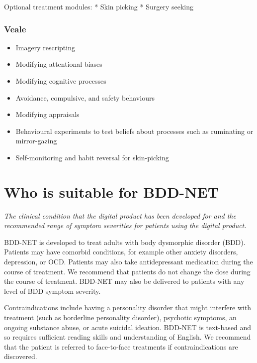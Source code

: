 \documentclass[]{book}
\providecommand{\tightlist}{%
  \setlength{\itemsep}{0pt}\setlength{\parskip}{0pt}}
\theoremstyle{definition}
\theoremstyle{definition}
\theoremstyle{definition}
\theoremstyle{remark}
\begin{document}
Optional treatment modules: * Skin picking * Surgery seeking

\hypertarget{veale-veale2010}{%
\subsubsection{\texorpdfstring{Veale
\citep{veale2010}}{Veale {[}@veale2010{]}}}\label{veale-veale2010}}

\begin{itemize}
\tightlist
\item
  Imagery rescripting
\item
  Modifying attentional biases
\item
  Modifying cognitive processes
\item
  Avoidance, compulsive, and safety behaviours
\item
  Modifying appraisals
\item
  Behavioural experiments to test beliefs about processes such as
  ruminating or mirror-gazing
\item
  Self-monitoring and habit reversal for skin-picking
\end{itemize}

\hypertarget{who-is-suitable-for-bdd-net}{%
\section{Who is suitable for
BDD-NET}\label{who-is-suitable-for-bdd-net}}

\emph{The clinical condition that the digital product has been developed
for and the recommended range of symptom severities for patients using
the digital product.}

BDD-NET is developed to treat adults with body dysmorphic disorder
(BDD). Patients may have comorbid conditions, for example other anxiety
disorders, depression, or OCD. Patients may also take antidepressant
medication during the course of treatment. We recommend that patients do
not change the dose during the course of treatment. BDD-NET may also be
delivered to patients with any level of BDD symptom severity.

Contraindications include having a personality disorder that might
interfere with treatment (such as borderline personality disorder),
psychotic symptoms, an ongoing substance abuse, or acute suicidal
ideation. BDD-NET is text-based and so requires sufficient reading
skills and understanding of English. We recommend that the patient is
referred to face-to-face treatments if contraindications are discovered.
\end{document}
